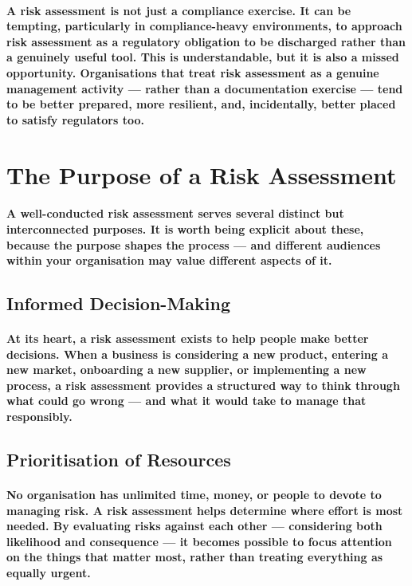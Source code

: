 \paragraph{\textbf{A risk assessment is not just a compliance exercise.} It can be tempting, particularly in compliance-heavy environments, to approach risk assessment as a regulatory obligation to be discharged rather than a genuinely useful tool. This is understandable, but it is also a missed opportunity. Organisations that treat risk assessment as a genuine management activity — rather than a documentation exercise — tend to be better prepared, more resilient, and, incidentally, better placed to satisfy regulators too.}

\section{The Purpose of a Risk Assessment}

\paragraph{A well-conducted risk assessment serves several distinct but interconnected purposes. It is worth being explicit about these, because the purpose shapes the process — and different audiences within your organisation may value different aspects of it.}

\subsection{Informed Decision-Making}
\paragraph{At its heart, a risk assessment exists to help people make better decisions. When a business is considering a new product, entering a new market, onboarding a new supplier, or implementing a new process, a risk assessment provides a structured way to think through what could go wrong — and what it would take to manage that responsibly.}

\subsection{Prioritisation of Resources}
\paragraph{No organisation has unlimited time, money, or people to devote to managing risk. A risk assessment helps determine where effort is most needed. By evaluating risks against each other — considering both likelihood and consequence — it becomes possible to focus attention on the things that matter most, rather than treating everything as equally urgent.}

